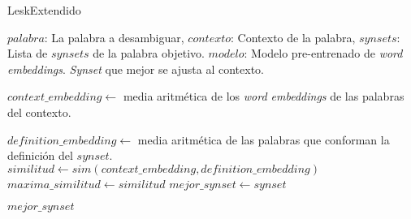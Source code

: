 \documentclass{article}
\begin{document}
	
	
	\begin{algorithm}
		\caption{LeskExtendido}
		\begin{algorithmic}[1]
			\scriptsize
			\Require $palabra$: La palabra a desambiguar, $contexto$: Contexto de la palabra, $synsets$: Lista de $synsets$ de la palabra objetivo. $modelo$: Modelo pre-entrenado de \textit{word embeddings}.
			\Ensure \textit{Synset} que mejor se ajusta al contexto.
			
			\State $context\_embedding \gets$ media aritm\'etica de los \textit{word embeddings} de las palabras del contexto.
			
			\State $definition\_embedding \gets$ media aritm\'etica de las palabras que conforman la definici\'on del $synset$.
			\State $similitud \gets sim(context\_embedding, definition\_embedding)$
			\State $maxima\_similitud \gets similitud$
			\State $mejor\_synset \gets synset$
			\EndIf
			\EndIf
			\EndFor
			
			\Return $mejor\_synset$
			\EndFunction
		\end{algorithmic}
	\end{algorithm}
	
\end{document}
